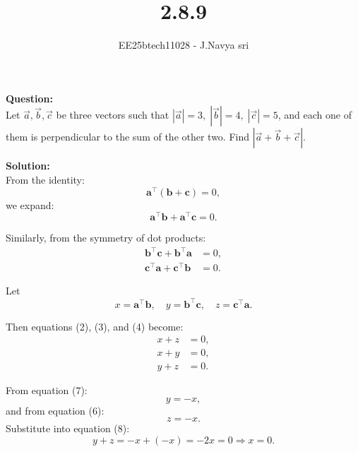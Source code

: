 \documentclass[journal]{IEEEtran}
\begin{document}

\vspace{3cm}

\title{2.8.9}
\author{EE25btech11028 - J.Navya sri}
{\let\newpage\relax\maketitle}


\textbf{Question:} \\
Let $\vec{a}, \vec{b}, \vec{c}$ be three vectors such that 
$|\vec{a}|=3,\; |\vec{b}|=4,\; |\vec{c}|=5$, and each one of them is perpendicular to the sum of the other two. 
Find $|\vec{a}+\vec{b}+\vec{c}|$.

\textbf{Solution:} \\
From the identity:
\begin{equation} \label{eq1}
\mathbf{a}^\top(\mathbf{b} + \mathbf{c}) = 0,
\end{equation}
we expand:
\begin{equation} \label{eq2}
\mathbf{a}^\top \mathbf{b} + \mathbf{a}^\top \mathbf{c} = 0.
\end{equation}

Similarly, from the symmetry of dot products:
\begin{align}
\mathbf{b}^\top \mathbf{c} + \mathbf{b}^\top \mathbf{a} &= 0, \label{eq3} \\
\mathbf{c}^\top \mathbf{a} + \mathbf{c}^\top \mathbf{b} &= 0. \label{eq4}
\end{align}

Let
\begin{equation} \label{eq5}
x = \mathbf{a}^\top \mathbf{b}, \quad y = \mathbf{b}^\top \mathbf{c}, \quad z = \mathbf{c}^\top \mathbf{a}.
\end{equation}

Then equations (2), (3), and (4) become:
\begin{align}
x + z &= 0, \label{eq6} \\
x + y &= 0, \label{eq7} \\
y + z &= 0. \label{eq8}
\end{align}

From equation (7):
\[
y = -x,
\]
and from equation (6):
\[
z = -x.
\]
Substitute into equation (8):
\[
y + z = -x + (-x) = -2x = 0 \Rightarrow x = 0.
\]
\end{document}
